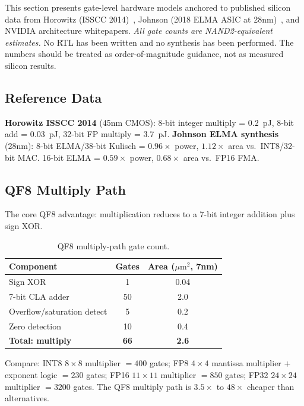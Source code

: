 \documentclass[11pt,letterpaper]{article}
\theoremstyle{definition}
\theoremstyle{remark}
\begin{document}
This section presents gate-level hardware models anchored to published silicon
data from Horowitz (ISSCC 2014)~\cite{horowitz2014}, Johnson (2018 ELMA ASIC at 28nm)~\cite{johnson2018}, and
NVIDIA architecture whitepapers.
\emph{All gate counts are NAND2-equivalent estimates.}
No RTL has been written and no synthesis has been performed.
The numbers should be treated as order-of-magnitude guidance, not as measured
silicon results.

\subsection{Reference Data}

\textbf{Horowitz ISSCC 2014} (45nm CMOS): 8-bit integer multiply = 0.2~pJ,
8-bit add = 0.03~pJ, 32-bit FP multiply = 3.7~pJ.
\textbf{Johnson ELMA synthesis} (28nm):
8-bit ELMA/38-bit Kulisch = $0.96\times$ power, $1.12\times$ area vs.\
INT8/32-bit MAC.
16-bit ELMA = $0.59\times$ power, $0.68\times$ area vs.\ FP16 FMA.

\subsection{QF8 Multiply Path}

The core QF8 advantage: multiplication reduces to a 7-bit integer addition plus
sign XOR.

\begin{table}[ht]
\centering
\caption{QF8 multiply-path gate count.}
\label{tab:qf8-multiply}
\begin{tabular}{@{}lcc@{}}
\toprule
Component & Gates & Area ($\mu\text{m}^2$, 7nm) \\
\midrule
Sign XOR                    & 1   & 0.04 \\
7-bit CLA adder             & 50  & 2.0  \\
Overflow/saturation detect  & 5   & 0.2  \\
Zero detection              & 10  & 0.4  \\
\midrule
\textbf{Total: multiply}    & \textbf{66} & \textbf{2.6} \\
\bottomrule
\end{tabular}
\end{table}

Compare: INT8 $8\times 8$ multiplier $= 400$ gates; FP8 $4\times 4$ mantissa
multiplier $+$ exponent logic $= 230$ gates; FP16 $11\times 11$ multiplier
$= 850$ gates; FP32 $24\times 24$ multiplier $= 3200$ gates.
The QF8 multiply path is $3.5\times$ to $48\times$ cheaper than
alternatives.
\end{document}
